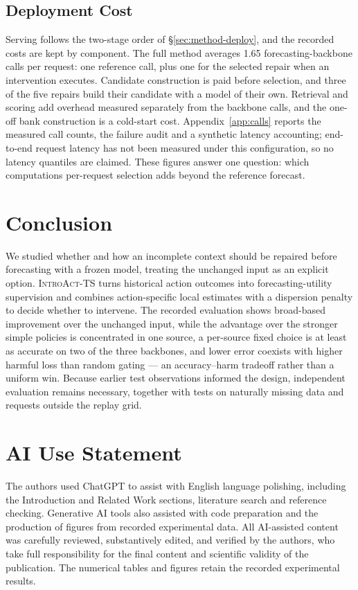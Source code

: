 \documentclass{article}
\newcommand{\introact}{\textsc{IntroAct-TS}}
\begin{document}
\subsection{Deployment Cost}
\label{sec:exp-cost}
Serving follows the two-stage order of \S\ref{sec:method-deploy}, and the recorded costs are
kept by component. The full method averages 1.65 forecasting-backbone calls per request: one
reference call, plus one for the selected repair when an intervention executes. Candidate
construction is paid before selection, and three of the five repairs build their candidate
with a model of their own. Retrieval and scoring add overhead measured separately from the
backbone calls, and the one-off bank construction is a cold-start cost.
Appendix~\ref{app:calls} reports the measured call counts, the failure audit and a synthetic
latency accounting; end-to-end request latency has not been measured under this
configuration, so no latency quantiles are claimed. These figures answer one question: which
computations per-request selection adds beyond the reference forecast.

\newpage
\section{Conclusion}
\label{sec:conclusion}
We studied whether and how an incomplete context should be repaired before forecasting with
a frozen model, treating the unchanged input as an explicit option. \introact{} turns
historical action outcomes into forecasting-utility supervision and combines action-specific
local estimates with a dispersion penalty to decide whether to intervene. The recorded
evaluation shows broad-based improvement over the unchanged input, while the advantage over
the stronger simple policies is concentrated in one source, a per-source fixed choice is at
least as accurate on two of the three backbones, and lower error coexists with higher harmful
loss than random gating — an accuracy--harm tradeoff rather than a uniform win. Because
earlier test observations informed the design, independent evaluation remains necessary,
together with tests on naturally missing data and requests outside the replay grid.
\label{sec:main-end}

\section*{AI Use Statement}
\label{sec:ai-statement}
The authors used ChatGPT to assist with English language polishing, including the
Introduction and Related Work sections, literature search and reference checking.
Generative AI tools also assisted with code preparation and the production of figures
from recorded experimental data. All AI-assisted content was carefully reviewed,
substantively edited, and verified by the authors, who take full responsibility for
the final content and scientific validity of the publication. The numerical tables
and figures retain the recorded experimental results.
\end{document}
